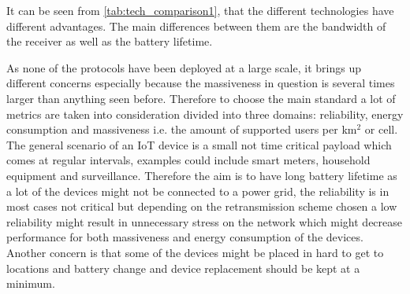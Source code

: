 
It can be seen from \autoref{tab:tech_comparison1}, that the different technologies have different advantages. The main differences between them are the bandwidth of the receiver as well as the battery lifetime. 

As none of the protocols have been deployed at a large scale, it brings up different concerns especially because the massiveness in question is several times larger than anything seen before. Therefore to choose the main standard a lot of metrics are taken into consideration divided into three domains: reliability, energy consumption and massiveness i.e. the amount of supported users per km$^2$ or cell. The general scenario of an IoT device is a small not time critical payload which comes at regular intervals, examples could include smart meters, household equipment and surveillance. Therefore the aim is to have long battery lifetime as a lot of the devices might not be connected to a power grid, the reliability is in most cases not critical but depending on the retransmission scheme chosen a low reliability might result in unnecessary stress on the network which might decrease performance for both massiveness and energy consumption of the devices. Another concern is that some of the devices might be placed in hard to get to locations and battery change and device replacement should be kept at a minimum.


